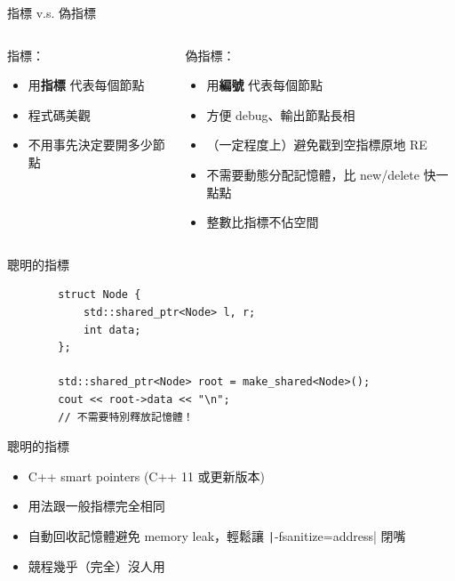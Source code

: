 \documentclass[aspectratio=169]{beamer}
\begin{document}
\begin{frame}{指標 v.s. 偽指標}
    \begin{columns}[totalwidth=\textwidth]
        \begin{column}{0.5\textwidth}
            指標：
        
            \begin{itemize}
                \item 用\textbf{指標} 代表每個節點
                \item 程式碼美觀
                \item 不用事先決定要開多少節點
            \end{itemize}
        \end{column}
        \begin{column}{0.5\textwidth}
            偽指標：

            \begin{itemize}
                \item 用\textbf{編號} 代表每個節點
                \item 方便 debug、輸出節點長相
                \item （一定程度上）避免戳到空指標原地 RE
                \item 不需要動態分配記憶體，比 new/delete 快一點點
                \item 整數比指標不佔空間
            \end{itemize}
        \end{column}
    \end{columns}
\end{frame}

\begin{frame}[fragile]{聰明的指標}
    \begin{verbatim}
        struct Node {
            std::shared_ptr<Node> l, r;
            int data;
        };

        std::shared_ptr<Node> root = make_shared<Node>();
        cout << root->data << "\n";
        // 不需要特別釋放記憶體！
    \end{verbatim}
\end{frame}

\begin{frame}{聰明的指標}
    \begin{itemize}
        \item C++ smart pointers (C++ 11 或更新版本)
        \item 用法跟一般指標完全相同
        \item 自動回收記憶體避免 memory leak，輕鬆讓 \texttt|-fsanitize=address| 閉嘴
        \item 競程幾乎（完全）沒人用
    \end{itemize}
\end{frame}
\end{document}
